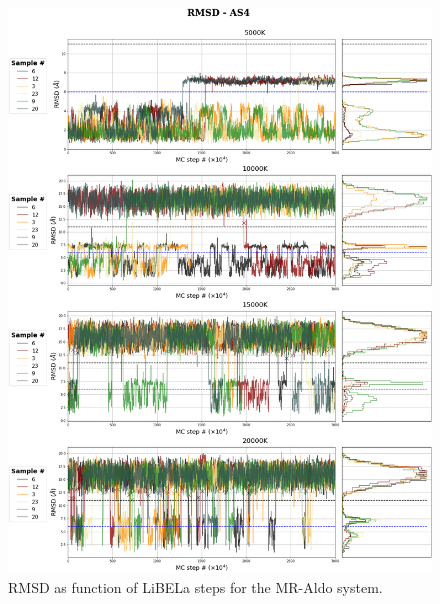 \documentclass[
  journal=usp, %
  manuscript=final-report,
  year=2023,
  volume=1,
]{cup-journal}
\begin{document}
{\begin{figure}[htbp]
\centering
\includegraphics[width=0.95\linewidth]{Images/MC_RMSD_MR-AS4_high.png}
\caption{RMSD as function of LiBELa steps for the MR-Aldo system.}
\label{MC_RMSD_steps}
\end{figure}



}
\end{document}
